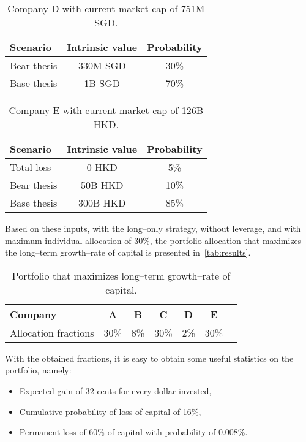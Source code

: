 \documentclass{article}
\begin{document}
\begin{table}[!b]
\caption{Company D with current market cap of 751M SGD.}
\vspace{0.25cm}
\centering
\begin{tabular}{l|c|c}
Scenario & Intrinsic value & Probability \\
\hline
Bear thesis & 330M SGD & 30\% \\
Base thesis & 1B SGD & 70\% \\
\end{tabular}%
\label{tab:companyD}%
\end{table}%

\begin{table}[!b]
\caption{Company E with current market cap of 126B HKD.}
\vspace{0.25cm}
\centering
\begin{tabular}{l|c|c}
Scenario & Intrinsic value & Probability \\
\hline
Total loss & 0 HKD & 5\% \\
Bear thesis & 50B HKD & 10\% \\
Base thesis & 300B HKD & 85\% \\
\end{tabular}%
\label{tab:companyE}%
\end{table}%

\indent Based on these inputs, with the long--only strategy, without leverage,
and with maximum individual allocation of 30\%, the portfolio allocation that
maximizes the long--term growth--rate of capital is presented
in~\autoref{tab:results}.

\begin{table}
\caption{Portfolio that maximizes long--term growth--rate of capital.}
\vspace{0.25cm}
\centering
\begin{tabular}{l|c|c|c|c|c|c}
Company & A & B & C & D & E \\
\hline
Allocation fractions & 30\% & 8\% & 30\% & 2\% & 30\% \\
\end{tabular}%
\label{tab:results}%
\end{table}%

With the obtained fractions, it is easy to obtain some useful
statistics on the portfolio, namely:
\begin{itemize}
    \item Expected gain of 32 cents for every dollar invested,
    \item Cumulative probability of loss of capital of 16\%,
    \item Permanent loss of 60\% of capital with probability of 0.008\%.
\end{itemize}
\end{document}
